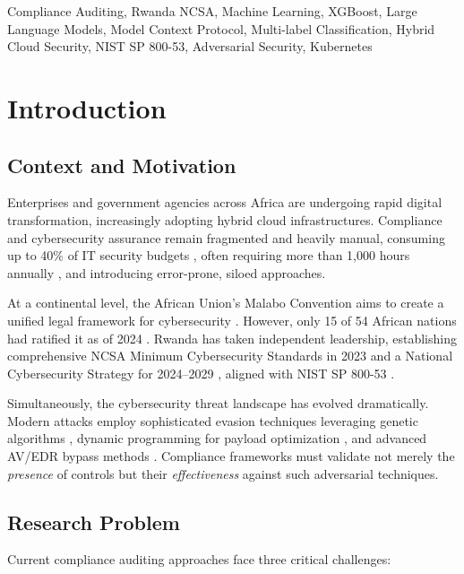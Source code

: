 \documentclass[11pt,conference]{IEEEtran}
\begin{document}
\begin{IEEEkeywords}
Compliance Auditing, Rwanda NCSA, Machine Learning, XGBoost, Large Language Models, Model Context Protocol, Multi-label Classification, Hybrid Cloud Security, NIST SP 800-53, Adversarial Security, Kubernetes
\end{IEEEkeywords}

\section{Introduction}

\subsection{Context and Motivation}

Enterprises and government agencies across Africa are undergoing rapid digital transformation, increasingly adopting hybrid cloud infrastructures. Compliance and cybersecurity assurance remain fragmented and heavily manual, consuming up to 40\% of IT security budgets \cite{ponemon_cost}, often requiring more than 1,000 hours annually \cite{cogr_report}, and introducing error-prone, siloed approaches.

At a continental level, the African Union's Malabo Convention aims to create a unified legal framework for cybersecurity \cite{malabo2014}. However, only 15 of 54 African nations had ratified it as of 2024 \cite{au_cybersecurity_status}. Rwanda has taken independent leadership, establishing comprehensive NCSA Minimum Cybersecurity Standards in 2023 \cite{ncsa2023} and a National Cybersecurity Strategy for 2024--2029 \cite{rwanda_strategy_2024}, aligned with NIST SP 800-53 \cite{nist2020}.

Simultaneously, the cybersecurity threat landscape has evolved dramatically. Modern attacks employ sophisticated evasion techniques leveraging genetic algorithms \cite{ga_xss_paper}, dynamic programming for payload optimization \cite{dp_payload_paper}, and advanced AV/EDR bypass methods \cite{reverse_shell_paper, mitre_attack_sok}. Compliance frameworks must validate not merely the \textit{presence} of controls but their \textit{effectiveness} against such adversarial techniques.

\subsection{Research Problem}

Current compliance auditing approaches face three critical challenges:
\end{document}
